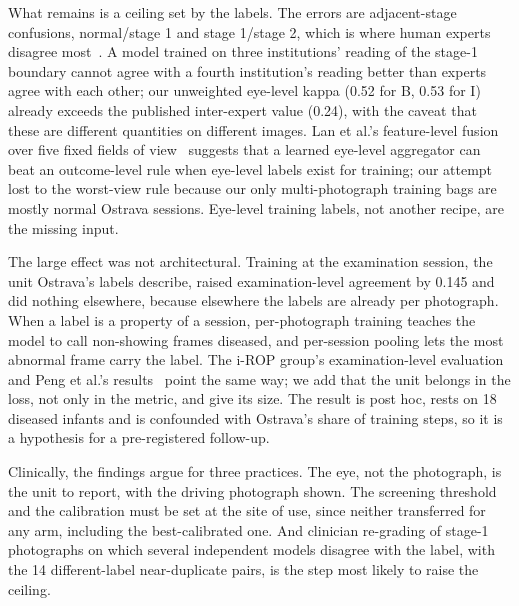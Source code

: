 \documentclass[conference]{IEEEtran}
\begin{document}
What remains is a ceiling set by the labels. The errors are adjacent-stage confusions, normal/stage 1 and stage 1/stage 2, which is where human experts disagree most~\cite{gschliesser2015,campbell2016}. A model trained on three institutions' reading of the stage-1 boundary cannot agree with a fourth institution's reading better than experts agree with each other; our unweighted eye-level kappa (0.52 for B, 0.53 for I) already exceeds the published inter-expert value (0.24), with the caveat that these are different quantities on different images. Lan et al.'s feature-level fusion over five fixed fields of view~\cite{lan2026} suggests that a learned eye-level aggregator can beat an outcome-level rule when eye-level labels exist for training; our attempt lost to the worst-view rule because our only multi-photograph training bags are mostly normal Ostrava sessions. Eye-level training labels, not another recipe, are the missing input.

The large effect was not architectural. Training at the examination session, the unit Ostrava's labels describe, raised examination-level agreement by 0.145 and did nothing elsewhere, because elsewhere the labels are already per photograph. When a label is a property of a session, per-photograph training teaches the model to call non-showing frames diseased, and per-session pooling lets the most abnormal frame carry the label. The i-ROP group's examination-level evaluation~\cite{brown2018,derks2025} and Peng et al.'s results~\cite{peng2021} point the same way; we add that the unit belongs in the loss, not only in the metric, and give its size. The result is post hoc, rests on 18 diseased infants and is confounded with Ostrava's share of training steps, so it is a hypothesis for a pre-registered follow-up.

Clinically, the findings argue for three practices. The eye, not the photograph, is the unit to report, with the driving photograph shown. The screening threshold and the calibration must be set at the site of use, since neither transferred for any arm, including the best-calibrated one. And clinician re-grading of stage-1 photographs on which several independent models disagree with the label, with the 14 different-label near-duplicate pairs, is the step most likely to raise the ceiling.
\end{document}
